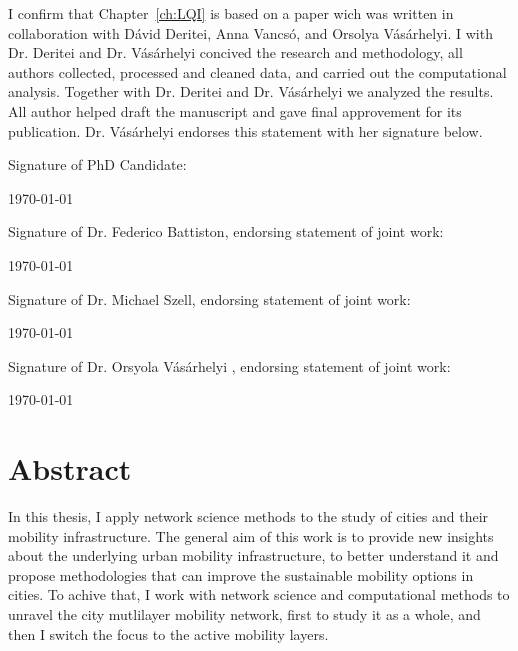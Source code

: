 \documentclass[a4paper,twoside,12pt]{book}
\begin{document}
\vspace{.2cm}

\noindent
I confirm that Chapter~\ref{ch:LQI} is based on a paper wich was written in collaboration with D\'avid Deritei, Anna Vancs\'o, and Orsolya V\'as\'arhelyi. I with Dr. Deritei and Dr. V\'as\'arhelyi concived the research and methodology, all authors collected, processed and cleaned data, and carried out the computational analysis. Together with Dr. Deritei and Dr. V\'as\'arhelyi we analyzed the results. All author helped draft the manuscript and gave final approvement for its publication. Dr. V\'as\'arhelyi endorses this statement with her signature below.

\vspace{0.5cm}
\noindent
Signature of PhD Candidate:

\vspace{2cm}
\noindent
\monthyeardate\today


\vspace{3.5cm}
\noindent
Signature of Dr. Federico Battiston, endorsing statement of joint work:

\vspace{2cm}
\noindent
\monthyeardate\today


\vspace{3.5cm}
\noindent
Signature of Dr. Michael Szell, endorsing statement of joint work:

\vspace{2cm}
\noindent
\monthyeardate\today

\vspace{3.5cm}
\noindent
Signature of Dr. Orsyola V\'as\'arhelyi , endorsing statement of joint work:

\vspace{2cm}
\noindent
\monthyeardate\today




\chapter*{Abstract}
In this thesis, I apply network science methods to the study of cities and their mobility infrastructure. The general aim of this work is to provide new insights about the underlying urban mobility infrastructure, to better understand it and propose methodologies that can improve the sustainable mobility options in cities. To achive that, I work with network science and computational methods to unravel the city mutlilayer mobility network, first to study it as a whole, and then I switch the focus to the active mobility layers.
\end{document}
